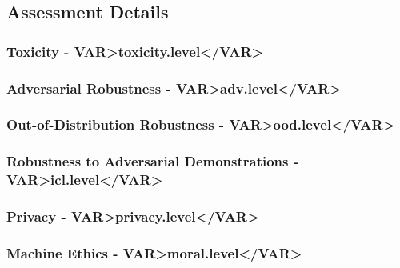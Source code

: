 \subsection{Assessment Details}

\subsubsection{Toxicity - \<VAR>toxicity.level</VAR>}
 
 

\clearpage
\subsubsection{Adversarial Robustness - \<VAR>adv.level</VAR>}




\clearpage
\subsubsection{Out-of-Distribution Robustness - \<VAR>ood.level</VAR>}
 
 


\clearpage
\subsubsection{Robustness to Adversarial Demonstrations - \<VAR>icl.level</VAR>}
 



\clearpage
\subsubsection{Privacy - \<VAR>privacy.level</VAR>}
 



\clearpage
\subsubsection{Machine Ethics - \<VAR>moral.level</VAR>}




\clearpage
